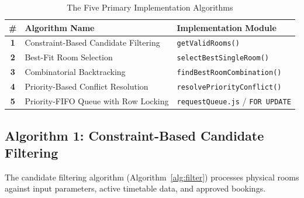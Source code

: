 \documentclass[conference]{IEEEtran}
\begin{document}
\begin{table}[t]
\caption{The Five Primary Implementation Algorithms}
\label{tab:alg_summary}
\centering
\small
\begin{tabular}{cll}
\toprule
\textbf{\#} & \textbf{Algorithm Name} & \textbf{Implementation Module} \\
\midrule
\textbf{1} & Constraint-Based Candidate Filtering & \texttt{getValidRooms()} \\
\textbf{2} & Best-Fit Room Selection & \texttt{selectBestSingleRoom()} \\
\textbf{3} & Combinatorial Backtracking & \texttt{findBestRoomCombination()} \\
\textbf{4} & Priority-Based Conflict Resolution & \texttt{resolvePriorityConflict()} \\
\textbf{5} & Priority-FIFO Queue with Row Locking & \texttt{requestQueue.js} / \texttt{FOR UPDATE} \\
\bottomrule
\end{tabular}
\end{table}

\subsection{Algorithm 1: Constraint-Based Candidate Filtering}
The candidate filtering algorithm (Algorithm~\ref{alg:filter}) processes physical rooms against input parameters, active timetable data, and approved bookings.
\end{document}
